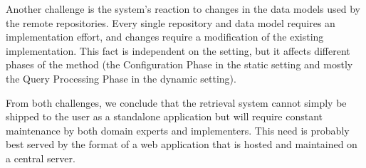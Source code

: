 Another challenge is the system's reaction to changes in the data models
used by the remote repositories. Every single repository and data model
requires an implementation effort, and changes require a modification
of the existing implementation. This fact is independent on the setting,
but it affects different phases of the method (the Configuration Phase
in the static setting and mostly the Query Processing Phase in the dynamic setting).

From both challenges, we conclude that the retrieval system 
cannot simply be shipped to the user as a standalone application
but will require constant maintenance by both domain experts
and implementers. This need is probably best served
by the format of a web application that is hosted and maintained
on a central server.

%
%
%
%
%        
